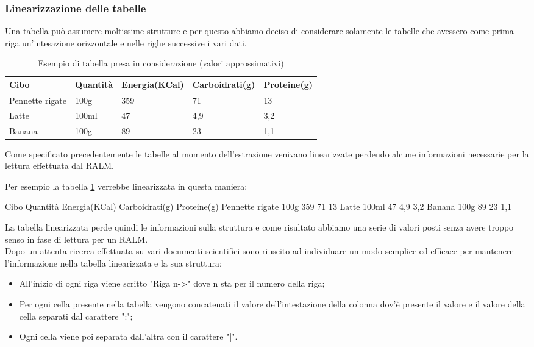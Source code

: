 \subsubsection{Linearizzazione delle tabelle}
Una tabella può assumere moltissime strutture e per questo abbiamo deciso di considerare solamente le tabelle che avessero come prima riga 
un'intesazione orizzontale e nelle righe successive i vari dati.

\begin{table}[H]
    \centering
    \begin{tabular}{|p{3cm} |p{2cm} |p{2cm}| p{2cm}| p{2cm}|}
        \hline
        Cibo & Quantità & Energia(KCal) & Carboidrati(g) & Proteine(g) \\
        \hline
        Pennette rigate & 100g & 359 & 71 & 13 \\
        \hline
        Latte & 100ml & 47 & 4,9 & 3,2 \\
        \hline
        Banana & 100g & 89 & 23 & 1,1 \\
        \hline
    \end{tabular}
    \caption{Esempio di tabella presa in considerazione (valori approssimativi)}
    \label{tab:esempio-cibo}
\end{table}
\noindent Come specificato precedentemente le tabelle al momento dell'estrazione venivano linearizzate 
perdendo alcune informazioni necessarie per la lettura effettuata dal RALM. 

\noindent Per esempio la tabella \ref{tab:esempio-cibo} verrebbe linearizzata in questa maniera:
\begin{tcolorbox}[colback=white, colframe=black]
    Cibo Quantità Energia(KCal) Carboidrati(g) Proteine(g) Pennette rigate  100g  359  71  13 Latte 100ml 47 4,9 3,2 Banana  100g 89 23 1,1
\end{tcolorbox}
\noindent La tabella linearizzata perde quindi le informazioni sulla struttura e come risultato abbiamo una serie di valori posti senza avere troppo senso in fase di lettura per un RALM. \\

\noindent Dopo un attenta ricerca effettuata su vari documenti scientifici sono riuscito ad individuare un modo semplice ed efficace per mantenere 
l'informazione nella tabella linearizzata e la sua struttura:
\begin{itemize}
    \item All'inizio di ogni riga viene scritto "Riga n->" dove n sta per il numero della riga;
    \item Per ogni cella presente nella tabella vengono concatenati il valore dell'intestazione della colonna dov'è presente il valore e il valore della cella separati dal carattere ":";
    \item Ogni cella viene poi separata dall'altra con il carattere "|".
\end{itemize} 

